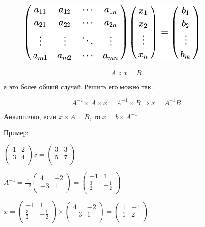 \documentclass{article}
\begin{document}
\begin{figure}[htp]
\centering
\includegraphics[scale=1.00]{linear-system.png}
\end{figure}

$$A\times x = B$$

а это более общий случай. Решить его можно так:

$$A^{-1}\times A \times x = A^{-1} \times B \Rightarrow x = A^{-1}B$$

Аналогично, если $x\times A = B$, то $x = b \times A^{-1}$

Пример:

$\begin{pmatrix}
	1 & 2\\
	3 & 4\\
\end{pmatrix} x = \begin{pmatrix}
	3 & 3\\
	5 & 7\\
\end{pmatrix}$

$A^{-1} = \frac 1{-2}\begin{pmatrix}
	4 & -2\\
	-3 & 1\\
\end{pmatrix} = \begin{pmatrix}
	-1 & 1\\
	\frac 32 & -\frac 12\\
\end{pmatrix}
$

$x =  \begin{pmatrix}
	-1 & 1\\
	\frac 32 & -\frac 12\\
\end{pmatrix} \times\begin{pmatrix}
	4 & -2\\
	-3 & 1\\
\end{pmatrix} = \begin{pmatrix}
	1 & -1\\
	1 & 2\\
\end{pmatrix}$
\end{document}
